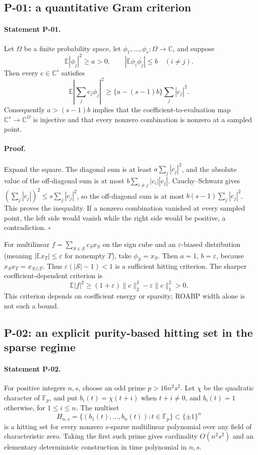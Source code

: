 \documentclass[11pt,a4paper]{article}
\theoremstyle{definition}\newtheorem{definition}{Definition}
\begin{document}
\subsection{P-01: a quantitative Gram criterion}
\paragraph{Statement P-01.}
Let $\Omega$ be a finite probability space, let $\phi_1,\ldots,\phi_s:\Omega\to\mathbb C$, and suppose
\[
 \mathbb E|\phi_j|^2\ge a>0,\qquad
 |\mathbb E\phi_i\overline{\phi_j}|\le b\quad(i\ne j).
\]
Then every $c\in\mathbb C^s$ satisfies
\[
 \mathbb E\left|\sum_jc_j\phi_j\right|^2
 \ge \{a-(s-1)b\}\sum_j|c_j|^2.
\]
Consequently $a>(s-1)b$ implies that the coefficient-to-evaluation map $\mathbb C^s\to\mathbb C^\Omega$ is injective and that every nonzero combination is nonzero at a sampled point.
\paragraph{Proof.}
Expand the square. The diagonal sum is at least $a\sum_j|c_j|^2$, and the absolute value of the off-diagonal sum is at most $b\sum_{i\ne j}|c_i||c_j|$. Cauchy--Schwarz gives $(\sum_j|c_j|)^2\le s\sum_j|c_j|^2$, so the off-diagonal sum is at most $b(s-1)\sum_j|c_j|^2$. This proves the inequality. If a nonzero combination vanished at every sampled point, the left side would vanish while the right side would be positive, a contradiction. $\square$

For multilinear $f=\sum_{S\in\mathcal S}c_Sx_S$ on the sign cube and an $\varepsilon$-biased distribution (meaning $|\mathbb E x_T|\le\varepsilon$ for nonempty $T$), take $\phi_S=x_S$. Then $a=1$, $b=\varepsilon$, because $x_Sx_T=x_{S\triangle T}$. Thus $\varepsilon(|\mathcal S|-1)<1$ is a sufficient hitting criterion. The sharper coefficient-dependent criterion is
\[
 \mathbb E|f|^2\ge (1+\varepsilon)\|c\|_2^2-\varepsilon\|c\|_1^2>0.
\]
This criterion depends on coefficient energy or sparsity; ROABP width alone is not such a bound.

\subsection{P-02: an explicit purity-based hitting set in the sparse regime}
\paragraph{Statement P-02.}
For positive integers $n,s$, choose an odd prime $p>16n^2s^2$. Let $\chi$ be the quadratic character of $\mathbb F_p$, and put $b_i(t)=\chi(t+i)$ when $t+i\ne0$, and $b_i(t)=1$ otherwise, for $1\le i\le n$. The multiset
\[
 H_{n,s}=\{(b_1(t),\ldots,b_n(t)):t\in\mathbb F_p\}\subset\{\pm1\}^n
\]
is a hitting set for every nonzero $s$-sparse multilinear polynomial over any field of characteristic zero. Taking the first such prime gives cardinality $O(n^2s^2)$ and an elementary deterministic construction in time polynomial in $n,s$.
\end{document}
